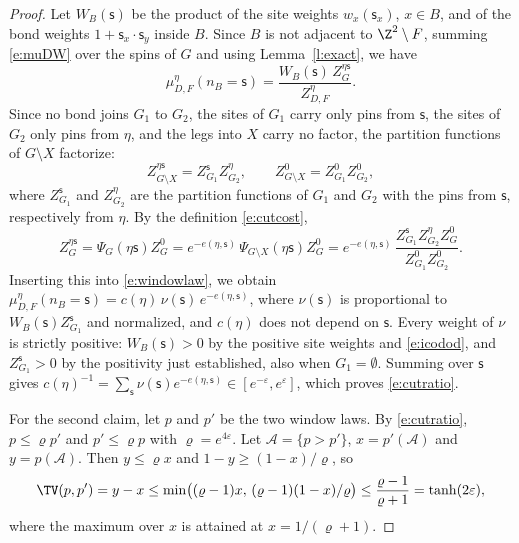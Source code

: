\begin{proof}
Let $W_B(\mathsf s)$ be the product of the site weights $w_x(\mathsf s_x)$, $x \in B$, and of the bond weights $1 + \mathsf s_x \cdot \mathsf s_y$ inside $B$. Since $B$ is not adjacent to $\Z^2 \setminus F$, summing \eqref{e:muDW} over the spins of $G$ and using Lemma~\ref{l:exact}, we have
\begin{equation}\label{e:windowlaw}
\mu^\eta_{D, F}(n_B = \mathsf s) = \frac{W_B(\mathsf s) \, Z^{\eta \mathsf s}_G}{Z^\eta_{D, F}} .
\end{equation}
Since no bond joins $G_1$ to $G_2$, the sites of $G_1$ carry only pins from $\mathsf s$, the sites of $G_2$ only pins from $\eta$, and the legs into $X$ carry no factor, the partition functions of $G \setminus X$ factorize:
\begin{equation*}
Z^{\eta \mathsf s}_{G \setminus X} = Z^{\mathsf s}_{G_1} Z^{\eta}_{G_2}, \qquad Z^0_{G \setminus X} = Z^0_{G_1} Z^0_{G_2},
\end{equation*}
where $Z^{\mathsf s}_{G_1}$ and $Z^\eta_{G_2}$ are the partition functions of $G_1$ and $G_2$ with the pins from $\mathsf s$, respectively from $\eta$. By the definition \eqref{e:cutcost},
\begin{equation*}
Z^{\eta \mathsf s}_G = \Psi_G(\eta \mathsf s) Z^0_G = e^{-e(\eta, \mathsf s)} \, \Psi_{G \setminus X}(\eta \mathsf s) Z^0_G = e^{-e(\eta, \mathsf s)} \, \frac{Z^{\mathsf s}_{G_1} Z^\eta_{G_2} Z^0_G}{Z^0_{G_1} Z^0_{G_2}} .
\end{equation*}
Inserting this into \eqref{e:windowlaw}, we obtain $\mu^\eta_{D, F}(n_B = \mathsf s) = c(\eta) \, \nu(\mathsf s) \, e^{-e(\eta, \mathsf s)}$, where $\nu(\mathsf s)$ is proportional to $W_B(\mathsf s) Z^{\mathsf s}_{G_1}$ and normalized, and $c(\eta)$ does not depend on $\mathsf s$. Every weight of $\nu$ is strictly positive: $W_B(\mathsf s)>0$ by the positive site weights and \eqref{e:icodod}, and $Z^{\mathsf s}_{G_1}>0$ by the positivity just established, also when $G_1=\emptyset$. Summing over $\mathsf s$ gives $c(\eta)^{-1} = \sum_{\mathsf s} \nu(\mathsf s) e^{-e(\eta, \mathsf s)} \in [e^{-\varepsilon}, e^{\varepsilon}]$, which proves \eqref{e:cutratio}.

For the second claim, let $p$ and $p'$ be the two window laws. By \eqref{e:cutratio}, $p \le \varrho p'$ and $p' \le \varrho p$ with $\varrho = e^{4 \varepsilon}$. Let $\mathcal A = \{p > p'\}$, $x = p'(\mathcal A)$ and $y = p(\mathcal A)$. Then $y \le \varrho x$ and $1 - y \ge (1 - x)/\varrho$, so
\begin{equation*}
\TV(p, p') = y - x \le \min\bigl( (\varrho - 1) x, \, (\varrho - 1)(1 - x)/\varrho \bigr) \le \frac{\varrho - 1}{\varrho + 1} = \tanh(2 \varepsilon),
\end{equation*}
where the maximum over $x$ is attained at $x = 1/(\varrho + 1)$.
\end{proof}

